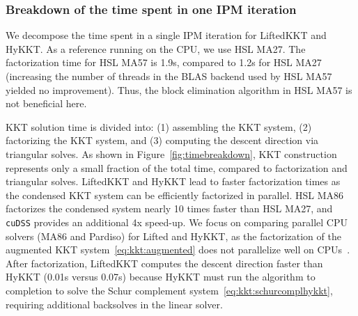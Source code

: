\subsubsection{Breakdown of the time spent in one IPM iteration}
We decompose the time spent in a single IPM iteration for LiftedKKT and HyKKT.
As a reference running on the CPU, we use HSL MA27.
The factorization time for HSL MA57 is 1.9s, compared to 1.2s for HSL MA27
(increasing the number of threads in the BLAS backend used by HSL MA57 yielded no improvement).
Thus, the block elimination algorithm in HSL MA57 is not beneficial here.

KKT solution time is divided into:
(1) assembling the KKT system,
(2) factorizing the KKT system, and (3) computing the descent direction via triangular solves.
As shown in Figure~\ref{fig:timebreakdown}, KKT construction represents only
a small fraction of the total time, compared to factorization and triangular solves.
LiftedKKT and HyKKT lead to faster factorization times
as the condensed KKT system can be efficiently factorized in parallel. HSL MA86
factorizes the condensed system nearly 10 times faster than HSL MA27, and
{\tt cuDSS} provides an additional 4x speed-up.
We focus on comparing parallel CPU solvers (MA86 and Pardiso) for Lifted and HyKKT,
as the factorization of the augmented KKT system~\eqref{eq:kkt:augmented}
does not parallelize well on CPUs~\cite{tasseff2019exploring}.
After factorization, LiftedKKT computes the descent direction faster than HyKKT
(0.01s versus 0.07s) because HyKKT must run the \CG algorithm to completion to solve the Schur complement
system~\eqref{eq:kkt:schurcomplhykkt}, requiring additional backsolves in the linear solver.

